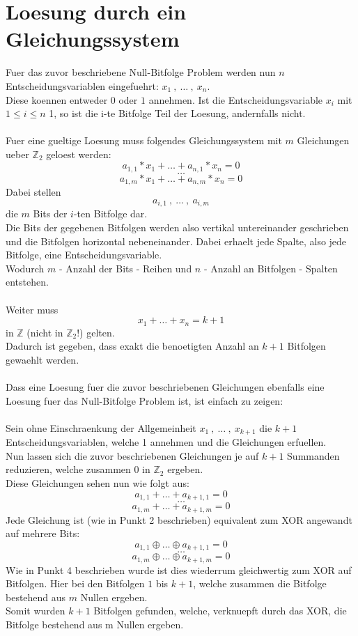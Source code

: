\documentclass[a4paper,10pt,ngerman]{scrartcl}
\begin{document}
\section{Loesung durch ein Gleichungssystem}
Fuer das zuvor beschriebene Null-Bitfolge Problem werden nun \(n\) Entscheidungsvariablen eingefuehrt: \(x_1 \ , \ \dots \ , \ x_n\).\\
Diese koennen entweder \(0\) oder \(1\) annehmen. Ist die Entscheidungsvariable \(x_i\) mit \(1 \leq i \leq n\) 1, so ist die i-te Bitfolge Teil der Loesung, andernfalls nicht.\\\\
Fuer eine gueltige Loesung muss folgendes Gleichungssystem mit \(m\) Gleichungen ueber \(\mathbb{Z}_{2}\) geloest werden:\\
\[a_{1, 1} * x_1 + \dots + a_{n, 1} * x_n = 0\]
\[\dots\]
\[a_{1, m} * x_1 + \dots + a_{n, m}  * x_n = 0\]
Dabei stellen 
\[a_{i, 1} \ , \ \dots \ , \ a_{i, m}\]
die \(m\) Bits der $i$-ten Bitfolge dar.\\
Die Bits der gegebenen Bitfolgen werden also vertikal untereinander geschrieben und die Bitfolgen horizontal nebeneinander. Dabei erhaelt jede Spalte, also jede Bitfolge, eine Entscheidungsvariable.\\
Wodurch \(m\) - Anzahl der Bits - Reihen und \(n\) - Anzahl an Bitfolgen - Spalten entstehen.\\\\
Weiter muss 
\[x_1 + \dots + x_n = k + 1\]
in \(\mathbb{Z}\) (nicht in \(\mathbb{Z}_{2}\)!) gelten.\\
Dadurch ist gegeben, dass exakt die benoetigten Anzahl an \(k + 1\) Bitfolgen gewaehlt werden.\\\\
Dass eine Loesung fuer die zuvor beschriebenen Gleichungen ebenfalls eine Loesung fuer das Null-Bitfolge Problem ist, ist einfach zu zeigen:\\\\
Sein ohne Einschraenkung der Allgemeinheit \(x_1 \ , \ \dots \ , \ x_{k+1}\) die \(k + 1\) Entscheidungsvariablen, welche 1 annehmen und die Gleichungen erfuellen.\\
Nun lassen sich die zuvor beschriebenen Gleichungen je auf \(k + 1\) Summanden reduzieren, welche zusammen 0 in \(\mathbb{Z}_{2}\) ergeben.\\
Diese Gleichungen sehen nun wie folgt aus:
\[a_{1, 1} + \dots + a_{k+1, 1} = 0\]
\[\dots\]
\[a_{1, m} + \dots + a_{k+1, m} = 0\]
Jede Gleichung ist (wie in Punkt 2 beschrieben) equivalent zum XOR angewandt auf mehrere Bits:
\[a_{1, 1} \oplus \dots \oplus a_{k+1, 1} = 0\]
\[\dots\]
\[a_{1, m} \oplus \dots \oplus a_{k+1, m} = 0\]
Wie in Punkt 4 beschrieben wurde ist dies wiederrum gleichwertig zum XOR auf Bitfolgen. Hier bei den Bitfolgen \(1\) bis \(k + 1\), welche zusammen die Bitfolge bestehend aus \(m\) Nullen ergeben.\\
Somit wurden \(k + 1\) Bitfolgen gefunden, welche, verknuepft durch das XOR, die Bitfolge bestehend aus m Nullen ergeben.
\end{document}
